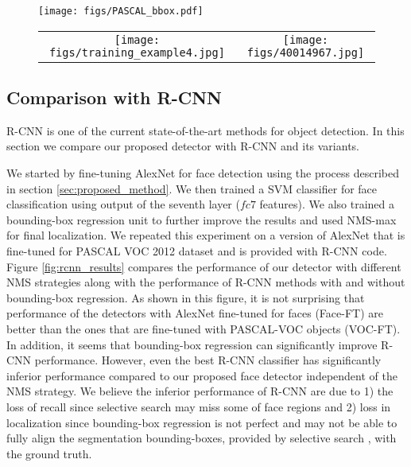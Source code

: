 \documentclass{sig-alternate-2013}
\begin{document}
\begin{figure}[t]
  \centering
    \texttt{[image: figs/PASCAL\_bbox.pdf]}
  \caption{}
  \label{fig:f_bbx_reg_effect}
\end{figure}

\begin{figure}[t]
  \centering
  	\begin{tabular}{cc}
    	\texttt{[image: figs/training\_example4.jpg]} &
    	\texttt{[image: figs/40014967.jpg]} 
    \end{tabular}
  \caption{}
  \label{fig:train_test_mismatch}
\end{figure}


\subsection{Comparison with R-CNN} 

R-CNN \cite{rcnn} is one of the current state-of-the-art methods for object detection. In this section we compare our proposed detector with R-CNN and its variants.

We started by fine-tuning AlexNet for face detection using the process described in section \ref{sec:proposed_method}. We then trained a SVM classifier for face classification using output of the seventh layer  ($fc7$ features). We also trained a bounding-box regression unit to further improve the results and used NMS-max for final localization. We repeated this experiment on a version of AlexNet that is fine-tuned for PASCAL VOC 2012 dataset and is provided with R-CNN code. Figure \ref{fig:rcnn_results} compares the performance of our detector with different NMS strategies along with the performance of R-CNN methods with and without bounding-box regression. As shown in this figure, it is not surprising that performance of the detectors with
AlexNet fine-tuned for faces (Face-FT) are better than the ones that are fine-tuned with PASCAL-VOC objects (VOC-FT). In addition, it seems that bounding-box regression can significantly improve R-CNN performance. However, even the best R-CNN classifier has significantly inferior performance compared to our proposed face detector independent of the NMS strategy. We believe the inferior performance of R-CNN are due to 1) the loss of recall since selective search may miss some of face regions and 2) loss in localization since bounding-box regression is not perfect and may not be able to fully align the segmentation bounding-boxes, provided by selective search \cite{selective_search}, with the ground truth.
\end{document}
